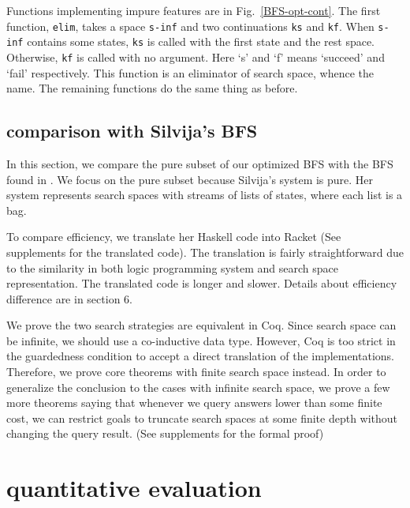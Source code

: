 \documentclass[format=acmlarge, review=true, authordraft=true]{acmart}
\begin{document}
Functions implementing impure features are in Fig.~\ref{BFS-opt-cont}. The 
first function, \texttt{elim}, takes a space \texttt{s-inf} and two 
continuations \texttt{ks} and \texttt{kf}. When \texttt{s-inf} contains some 
states, \texttt{ks} is called with the first state and the rest space. 
Otherwise, \texttt{kf} is called with no argument. Here `s' and `f' means 
`succeed' and `fail' respectively. This function is an eliminator of search 
space, whence the name. The remaining functions do the same thing as before.

\subsection{comparison with Silvija's BFS}

In this section, we compare the pure subset of our optimized BFS with the BFS 
found in \citep{seres1999algebra}. We focus on the pure subset because 
Silvija's system is pure. Her system represents search spaces with streams of 
lists of states, where each list is a bag.

To compare efficiency, we translate her Haskell code into Racket (See 
supplements for the translated code). The translation is fairly straightforward 
due to the similarity in both logic programming system and search space 
representation. The translated code is longer and slower. Details about 
efficiency difference are in section 6.

We prove the two search strategies are equivalent in Coq. Since search space 
can be infinite, we should use a co-inductive data type. However, Coq is too 
strict in the guardedness condition to accept a direct translation of the 
implementations. Therefore, we prove core theorems with finite search space 
instead. In order to generalize the conclusion to the cases with infinite 
search space, we prove a few more theorems saying that whenever we query 
answers lower than some finite cost, we can restrict goals to truncate search 
spaces at some finite depth without changing the query result. (See supplements 
for the formal proof)

\section{quantitative evaluation}
\end{document}
